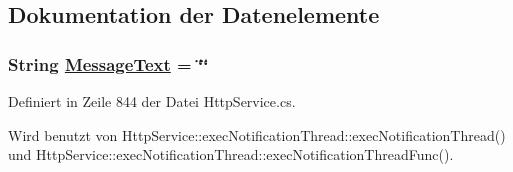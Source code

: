 \subsection{Dokumentation der Datenelemente}
\hypertarget{classQbeSAS_1_1HttpService_1_1execNotificationThread_QbeSAS_1_1HttpService_1_1execNotificationThreadr0}{
\subsubsection[MessageText]{\setlength{\rightskip}{0pt plus 5cm}String \hyperlink{classQbeSAS_1_1HttpService_1_1execNotificationThread_QbeSAS_1_1HttpService_1_1execNotificationThreadr0}{Message\-Text} = \char`\"{}\char`\"{}}}
\label{classQbeSAS_1_1HttpService_1_1execNotificationThread_QbeSAS_1_1HttpService_1_1execNotificationThreadr0}




Definiert in Zeile 844 der Datei Http\-Service.cs.

Wird benutzt von Http\-Service::exec\-Notification\-Thread::exec\-Notification\-Thread() und Http\-Service::exec\-Notification\-Thread::exec\-Notification\-Thread\-Func().